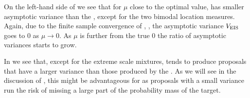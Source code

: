 On the left-hand side of  we see that for $\mu$ close to the optimal value, \aeis has smaller asymptotic variance than the \acem, except for the two bimodal location measures. Again, due to the finite sample convergence of \aeis, , the asymptotic variance $V_{{\text{EIS}}}$ goes to $0$ as $\mu \to 0$. As $\mu$ is further from the true $0$ the ratio of asymptotic variances starts to grow. 

In  we see that, except for the extreme scale mixtures, \aeis tends to produce proposals that have a larger variance than those produced by the \acem. As we will see in the discussion of , this might be advantageous for \aeis as proposals with a small variance run the risk of missing a large part of the probability mass of the target. 

